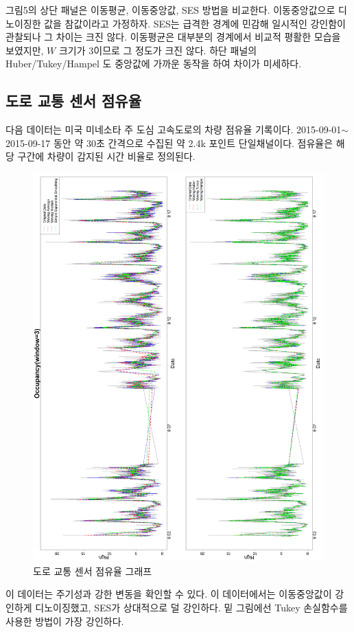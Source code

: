 \documentclass[letterpaper,12pt]{article}
\begin{document}
{그림5의 상단 패널은 이동평균, 이동중앙값, SES 방법을 비교한다. 이동중앙값으로 디노이징한 값을 참값이라고 가정하자. SES는 급격한 경계에 민감해 일시적인 강인함이 관찰되나 그 차이는 크진 않다. 이동평균은 대부분의 경계에서 비교적 평활한 모습을 보였지만, $W$ 크기가 3이므로 그 정도가 크진 않다. 하단 패널의 Huber/Tukey/Hampel 도 중앙값에 가까운 동작을 하여 차이가 미세하다.

\subsection{도로 교통 센서 점유율}\label{subsec:TBM}
다음 데이터는 미국 미네소타 주 도심 고속도로의 차량 점유율 기록이다. 2015-09-01$\sim$2015-09-17 동안 약 30초 간격으로 수집된 약 2.4k 포인트 단일채널이다. 점유율은 해당 구간에 차량이 감지된 시간 비율로 정의된다.
\begin{figure}[H]
    \centering
    \includegraphics[width=1\linewidth]{figures/OCC_3_1.png}
    \caption{도로 교통 센서 점유율 그래프}
    \label{fig:enter-label}
\end{figure}
이 데이터는 주기성과 강한 변동을 확인할 수 있다. 이 데이터에서는 이동중앙값이 강인하게 디노이징했고, SES가 상대적으로 덜 강인하다. 밑 그림에선 Tukey 손실함수를 사용한 방법이 가장 강인하다.
}
\end{document}
